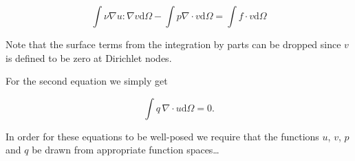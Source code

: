 \documentclass[thesis]{subfiles}
\begin{document}
\begin{equation}
  \int \nu \nabla u : \nabla v \textrm{d}\Omega
  - \int p \nabla \cdot v \textrm{d}\Omega
  = \int f \cdot v \textrm{d}\Omega
\end{equation}

Note that the surface terms from the integration by parts can be dropped since $v$ is defined to be zero at Dirichlet nodes.

For the second equation we simply get

\begin{equation}
  \int q \, \nabla \cdot u \textrm{d}\Omega = 0.
\end{equation}

In order for these equations to be well-posed we require that the functions $u$, $v$, $p$ and $q$ be drawn from appropriate function spaces\dots








\end{document}
